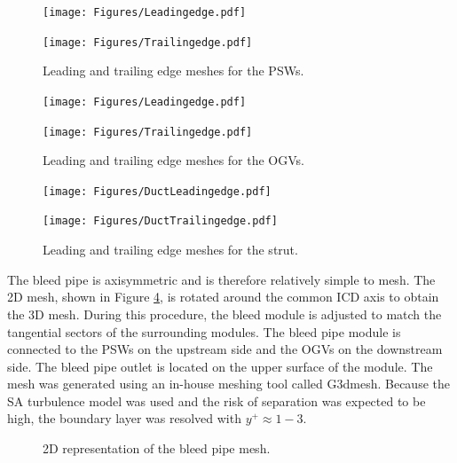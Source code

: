 \begin{figure}[h!]
  \centering
  \begin{minipage}{0.49\columnwidth}
  \texttt{[image: Figures/Leadingedge.pdf]}
  \end{minipage}
  \begin{minipage}{0.49\columnwidth}
  \texttt{[image: Figures/Trailingedge.pdf]}
  \end{minipage}
  \caption{Leading and trailing edge meshes for the PSWs.} \label{fig:meshPSW}
\end{figure}
\begin{figure}[h!]
  \begin{minipage}{0.49\columnwidth}
  \texttt{[image: Figures/Leadingedge.pdf]}
  \end{minipage}
  \begin{minipage}{0.49\columnwidth}
  \texttt{[image: Figures/Trailingedge.pdf]}
  \end{minipage}
  \caption{Leading and trailing edge meshes for the OGVs.} \label{fig:meshOGV}
\end{figure}
\begin{figure}[h!]
  \begin{minipage}{0.49\columnwidth}
  \texttt{[image: Figures/DuctLeadingedge.pdf]}
  \end{minipage}
  \begin{minipage}{0.49\columnwidth}
  \texttt{[image: Figures/DuctTrailingedge.pdf]}
  \end{minipage}  
  \caption{Leading and trailing edge meshes for the strut.} \label{fig:meshDuct}
\end{figure}
%
The bleed pipe is axisymmetric and is therefore relatively simple to mesh. The 2D mesh, shown in Figure \ref{fig:bleed}, is rotated around the common ICD axis to obtain the 3D mesh. During this procedure, the bleed module is adjusted to match the tangential sectors of the surrounding modules. The bleed pipe module is connected to the PSWs on the upstream side and the OGVs on the downstream side. The bleed pipe outlet is located on the upper surface of the module. The mesh was generated using an in-house meshing tool called G3dmesh. Because the SA turbulence model was used and the risk of separation was expected to be high, the boundary layer was resolved with $y^+\approx1-3$.

\begin{figure}[H]
  \centering
\caption{2D representation of the bleed pipe mesh.}\label{fig:bleed}
\end{figure}


